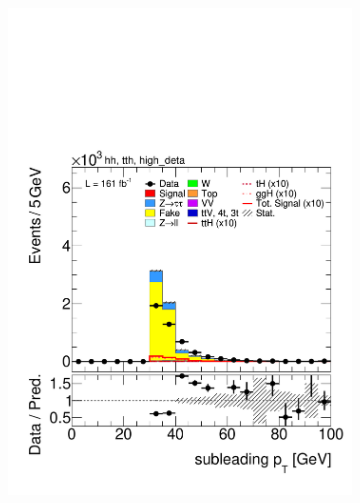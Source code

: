 \begin{figure}[htbp]
      \begin{subfigure}[b]{0.45\textwidth}
        \centering
        \includegraphics[width=\textwidth]{images/highdeta_highdeta_run3/plot_tau_1_pt_hh_tth_22_23_24_high_deta.pdf}
        \caption{}
      \end{subfigure}
      \hfill
      \begin{subfigure}[b]{0.45\textwidth}
        \centering

\end{subfigure}
\end{figure}
